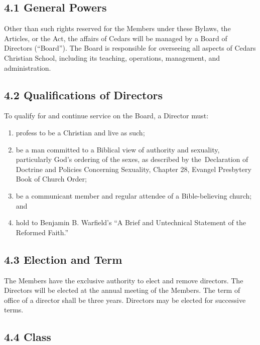 \documentclass[
]{book}
\begin{document}
\subsection{4.1 General Powers}\label{general-powers}

Other than such rights reserved for the Members under these Bylaws, the Articles, or the Act, the affairs of Cedars will be managed by a Board of Directors (``Board''). The Board is responsible for overseeing all aspects of Cedars Christian School, including its teaching, operations, management, and administration.

\subsection{4.2 Qualifications of Directors}\label{qualifications-of-directors}

To qualify for and continue service on the Board, a Director must:

\begin{enumerate}
\def\labelenumi{\alph{enumi}.}
\item
  profess to be a Christian and live as such;
\item
  be a man committed to a Biblical view of authority and sexuality, particularly God's ordering of the sexes, as described by the~Declaration of Doctrine and Policies Concerning Sexuality, Chapter 28, Evangel Presbytery Book of Church Order;
\item
  be a communicant member and regular attendee of a Bible-believing church; and
\item
  hold to Benjamin B. Warfield's ``A Brief and Untechnical Statement of the Reformed Faith.''
\end{enumerate}

\subsection{4.3 Election and Term}\label{election-and-term}

The Members have the exclusive authority to elect and remove directors. The Directors will be elected at the annual meeting of the Members. The term of office of a director shall be three years. Directors may be elected for successive terms.

\subsection{4.4 Class}\label{class}
\end{document}
